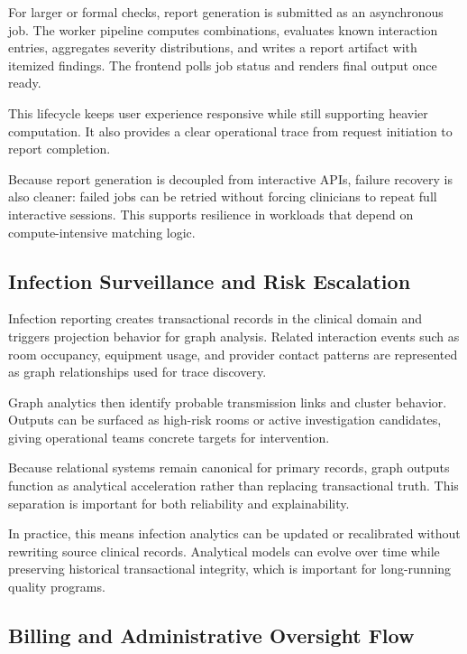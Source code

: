 For larger or formal checks, report generation is submitted as an asynchronous job. The worker pipeline computes combinations, evaluates known interaction entries, aggregates severity distributions, and writes a report artifact with itemized findings. The frontend polls job status and renders final output once ready.

This lifecycle keeps user experience responsive while still supporting heavier computation. It also provides a clear operational trace from request initiation to report completion.

Because report generation is decoupled from interactive APIs, failure recovery is also cleaner: failed jobs can be retried without forcing clinicians to repeat full interactive sessions. This supports resilience in workloads that depend on compute-intensive matching logic.

\subsection{Infection Surveillance and Risk Escalation}\label{5165-infection-surveillance-and-risk-escalation}

Infection reporting creates transactional records in the clinical domain and triggers projection behavior for graph analysis. Related interaction events such as room occupancy, equipment usage, and provider contact patterns are represented as graph relationships used for trace discovery.

Graph analytics then identify probable transmission links and cluster behavior. Outputs can be surfaced as high-risk rooms or active investigation candidates, giving operational teams concrete targets for intervention.

Because relational systems remain canonical for primary records, graph outputs function as analytical acceleration rather than replacing transactional truth. This separation is important for both reliability and explainability.

In practice, this means infection analytics can be updated or recalibrated without rewriting source clinical records. Analytical models can evolve over time while preserving historical transactional integrity, which is important for long-running quality programs.

\subsection{Billing and Administrative Oversight Flow}\label{5166-billing-and-administrative-oversight-flow}

